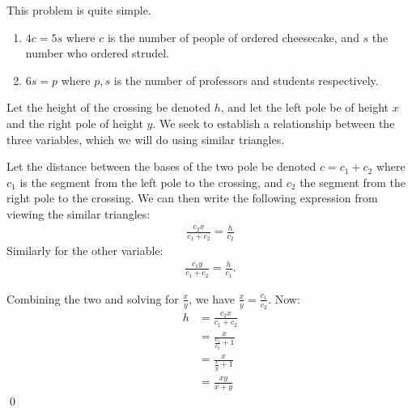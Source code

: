 \setcounter{Exercise}{4}
\begin{Exercise}
	This problem is quite simple.
	\begin{enumerate}
		\item $4c=5s$ where $c$ is the number of people of ordered cheesecake, and $s$ the number who ordered strudel.
		\item $6s = p$ where $p, s$ is the number of professors and students respectively.
	\end{enumerate}
\end{Exercise}

\begin{Exercise}
Let the height of the crossing be denoted $h$, and let the left pole be of height $x$ and the right pole of height $y$.
We seek to establish a relationship between the three variables, which we will do using similar triangles.

Let the distance between the bases of the two pole be denoted $c = c_1 + c_2$ where $c_1$ is the segment from the left pole
to the crossing, and $c_2$ the segment from the right pole to the crossing. 
We can then write the following expression from viewing the similar triangles:
\begin{align}
	\frac{c_2 x}{c_1 + c_2} = \frac{h}{c_2}
\end{align}
Similarly for the other variable:
\begin{align}
	\frac{c_1 y}{c_1 + c_2} = \frac{h}{c_1}.
\end{align}

Combining the two and solving for $\frac{x}{y}$, we have $\frac{x}{y} = \frac{c_1}{c_2}$. 
Now:
\begin{align}
	h &= \frac{c_2 x}{c_1 + c_2} \\
	&= \frac{x}{\frac{c_1}{c_2} + 1} \\
	&= \frac{x}{\frac{x}{y} + 1} \\
	&= \frac{xy}{x+y}
\end{align} \qed
\end{Exercise}
